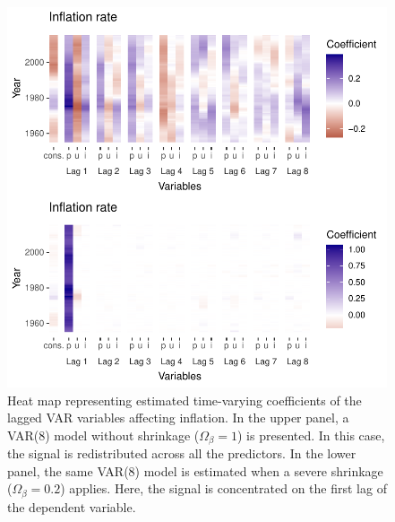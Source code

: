 \documentclass[
  12pt,
]{book}
\theoremstyle{break}
\theoremstyle{nonumberplain}
\begin{document}
\begin{figure}[H]

{\centering \includegraphics{Dynamic-Shrinkage-in-Bayesian-Structural-Time-Series-and-Vector-Autoregressive-Models_files/figure-latex/myfig72-1} 

}

\caption{Heat map representing estimated time-varying coefficients of the lagged VAR variables affecting inflation. In the upper panel, a VAR(8) model without shrinkage ($\Omega_\beta=1$) is presented. In this case, the signal is redistributed across all the predictors. In the lower panel, the same VAR(8) model is estimated when a severe shrinkage ($\Omega_\beta=0.2$) applies. Here, the signal is concentrated on the first lag of the dependent variable.}\label{fig:myfig72}
\end{figure}
\end{document}
